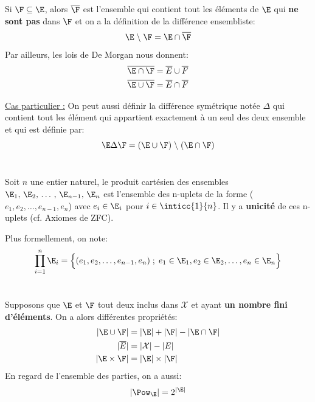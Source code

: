 \section*{}
Si \(\F \subseteq \E\), alors \(\overline{\F}\) est l'ensemble qui contient tout les éléments de \(\E\) qui \textbf{ne sont pas} dans \(\F\) et on a la définition de la différence ensembliste:
\[
   \E \;\backslash\; \F = \E \cap \overline{\F}   
\]
Par ailleurs, les lois de De Morgan nous donnent:
\begin{align*}
   \overline{\E \cap \F} = \overline{E} \cup \overline{F} \\
   \overline{\E \cup \F} = \overline{E} \cap \overline{F} \\
\end{align*}

\underline{Cas particulier {:}}
On peut aussi définir la différence symétrique notée \(\Delta\) qui contient tout les élément qui appartient exactement à un seul des deux ensemble et qui est définie par:
\[
   \E \Delta \F = (\E \cup \F) \;\backslash\; (\E \cap \F)   
\]
\section*{}
Soit \(n\) une entier naturel, le produit cartésien des ensembles \(\E_1,\, \E_2,\, \ldots\,,\, \E_{n-1},\, \E_n\) est l'ensemble des n-uplets de la forme (\(e_1, e_2, \ldots, e_{n-1}, e_n\)) avec \(e_i \in \E_i\) pour \(i \in \inticc{1}{n}\).
Il y a \textbf{unicité} de ces n-uplets (cf. Axiomes de ZFC).

Plus formellement, on note:
\[
     \prod_{i=1}^{n} \E_i = \Bigl\{ (e_1, e_2, \ldots, e_{n-1}, e_n) \; ; \; e_1 \in \E_1, e_2 \in \E_2, \ldots,  e_n \in \E_n \Bigl\}
\]
\section*{}
Supposons que \(\E\) et \(\F\) tout deux inclus dans \(\mathcal{X}\) et ayant \textbf{un nombre fini d'éléments}. On a alors différentes propriétés:
\begin{align*}
   |\E \cup \F| &= |\E| + |\F| - |\E \cap \F| \\
   |\overline{E}| &= |\mathcal{X}| - |E| \\
   |\E \times \F| &= |\E| \times |\F|
\end{align*}
En regard de l'ensemble des parties, on a aussi:
\[
   |\Pow_\E| = 2^{|\E|}  
\]

